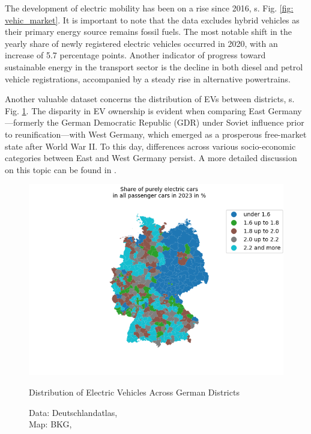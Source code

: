 The development of electric mobility has been on a rise since 2016, s. Fig. \ref{fig: vehic_market}. It is important to note that the data excludes hybrid vehicles as their primary energy source remains fossil fuels. The most notable shift in the yearly share of newly registered electric vehicles occurred in 2020, with an increase of 5.7 percentage points. Another indicator of progress toward sustainable energy in the transport sector is the decline in both diesel and petrol vehicle registrations, accompanied by a steady rise in alternative powertrains. 

Another valuable dataset concerns the distribution of EVs between districts, s. Fig. \ref{fig: districts}. The disparity in EV ownership is evident when comparing East Germany—formerly the German Democratic Republic (GDR) under Soviet influence prior to reunification—with West Germany, which emerged as a prosperous free-market state after World War II. To this day, differences across various socio-economic categories between East and West Germany persist. A more detailed discussion on this topic can be found in \cite{BundestagOstWest}.
\begin{figure}[H]
	\begin{center}
		\includegraphics[width=\linewidth]{images/EV_percentage.png}
		\caption{Distribution of Electric Vehicles Across German Districts}
		\label{fig: districts}
  		\caption*{Data: Deutschlandatlas, \cite{DeAtlasEVXLSX} \\
  				Map: BKG, \cite{BKG} } 
  	\end{center}
\end{figure}
